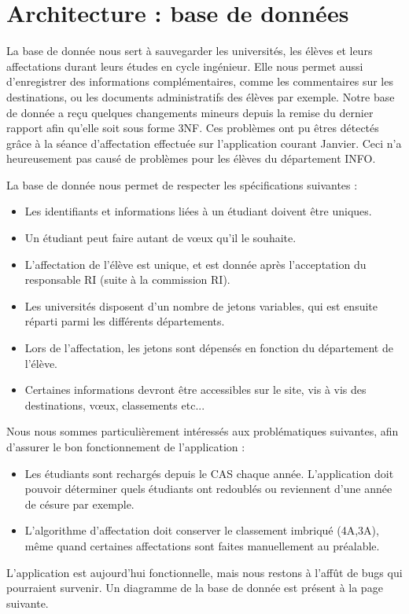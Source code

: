 \chapter{Architecture : base de données}

La base de donnée nous sert à sauvegarder les universités, les élèves et leurs affectations durant leurs études en cycle ingénieur. Elle nous permet aussi d'enregistrer des informations complémentaires, comme les commentaires sur les destinations, ou les documents administratifs des élèves par exemple.
\bigbreak
Notre base de donnée a reçu quelques changements mineurs depuis la remise du dernier rapport afin qu'elle soit sous forme 3NF. Ces problèmes ont pu êtres détectés grâce à la séance d'affectation effectuée sur l'application courant Janvier. Ceci n'a heureusement pas causé de problèmes pour les élèves du département INFO.

La base de donnée nous permet de respecter les spécifications suivantes :
\bigbreak
\begin{itemize}
	\item Les identifiants et informations liées à un étudiant doivent être uniques.
	\item Un étudiant peut faire autant de vœux qu'il le souhaite.
	\item L'affectation de l'élève est unique, et est donnée après l'acceptation du responsable RI (suite à la commission RI).
	\item Les universités disposent d'un nombre de jetons variables, qui est ensuite réparti parmi les différents départements.
	\item Lors de l'affectation, les jetons sont dépensés en fonction du département de l'élève.
	\item Certaines informations devront être accessibles sur le site, vis à vis des destinations, vœux, classements etc...
\end{itemize}
\bigbreak
Nous nous sommes particulièrement intéressés aux problématiques suivantes, afin d'assurer le bon fonctionnement de l'application :
\bigbreak
\begin{itemize}
	\item Les étudiants sont rechargés depuis le CAS chaque année. L'application doit pouvoir déterminer quels étudiants ont redoublés ou reviennent d'une année de césure par exemple.
	\item L'algorithme d'affectation doit conserver le classement imbriqué (4A,3A), même quand certaines affectations sont faites manuellement au préalable.
\end{itemize}
\bigbreak
L'application est aujourd'hui fonctionnelle, mais nous restons à l'affût de bugs qui pourraient survenir. Un diagramme de la base de donnée est présent à la page suivante.

